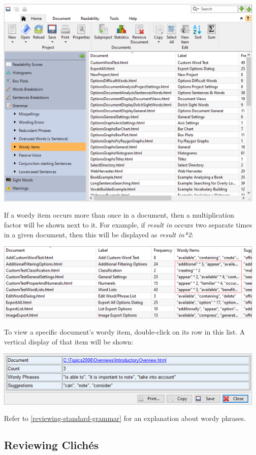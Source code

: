 \documentclass[
]{book}
\theoremstyle{definition}
\theoremstyle{definition}
\theoremstyle{definition}
\theoremstyle{definition}
\theoremstyle{remark}
\begin{document}
\includegraphics{Images/batchwordyphrases.png}

If a wordy item occurs more than once in a document, then a multiplication factor will be shown next to it. For example, if \emph{result in} occurs two separate times in a given document, then this will be displayed as \emph{result in*2}:

\includegraphics{Images/batchwordyphrasesmultiple.png}

To view a specific document's wordy item, double-click on its row in this list. A vertical display of that item will be shown:

\includegraphics{Images/viewitemwordyphrase.png}

Refer to \ref{reviewing-standard-grammar} for an explanation about wordy phrases.

\hypertarget{reviewing-batch-cliches}{%
\subsection*{Reviewing Clichés}\label{reviewing-batch-cliches}}
\end{document}
